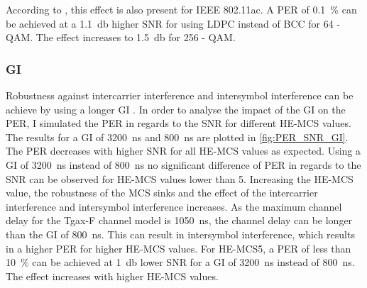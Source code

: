 According to \textcite{tran_asic_2014}, this effect is also present for IEEE 802.11ac. A \ac{PER} of \SI{0.1}{\percent} can be achieved at a
\SI{1.1}{\decibel} higher \ac{SNR} for using \ac{LDPC} instead of \ac{BCC} for 64 - \ac{QAM}. The effect increases to \SI{1.5}{\decibel} for 256 - \ac{QAM}.

\subsubsection*{\acf{GI}}

Robustness against intercarrier interference and intersymbol interference can be achieve by using a longer \ac{GI} \cite{pulimamidi_development_2007}. In order to analyse the impact of the \ac{GI} on the \ac{PER},
I simulated the \ac{PER} in regards to the \ac{SNR} for different HE-MCS values. The results for a \ac{GI} of \SI{3200}{\nano\second} and \SI{800}{\nano\second} are plotted in \autoref{fig:PER_SNR_GI}.
The \ac{PER} decreases with higher \ac{SNR} for all HE-MCS values as expected. Using a \ac{GI} of \SI{3200}{\nano\second} instead of \SI{800}{\nano\second} no significant difference of \ac{PER} in regards to the \ac{SNR} can be observed for HE-\ac{MCS} values lower than \num{5}.
Increasing the HE-\ac{MCS} value, the robustness of the \ac{MCS} sinks and the effect of the intercarrier interference and intersymbol interference increases.
As the maximum channel delay for the Tgax-F channel model is \SI{1050}{\nano\second}, the channel delay can be longer than the \ac{GI} of \SI{800}{\nano\second}. This
can result in intersymbol interference, which results in a higher \ac{PER} for higher HE-\ac{MCS} values.
For HE-\ac{MCS}\num{5}, a \ac{PER} of less than \SI{10}{\percent} can be achieved at \SI{1}{\decibel} lower \ac{SNR} for a \ac{GI} of \SI{3200}{\nano\second} instead of \SI{800}{\nano\second}. The effect increases
with higher HE-\ac{MCS} values.

